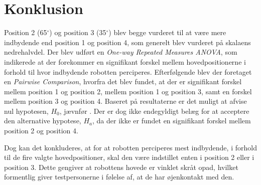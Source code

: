 \section{Konklusion}
\label{SkaleringseksperimentKonklusion}
%
Position 2 (65$^{\circ}$) og position 3 (35$^{\circ}$) blev begge vurderet til at være mere indbydende end position 1 og position 4, som generelt blev vurderet på skalaens nedrehalvdel. Der blev udført en \textit{One-way Repeated Measures ANOVA}, som indikerede at der forekommer en signifikant forskel mellem hovedpositionerne i forhold til hvor indbydende robotten perciperes. Efterfølgende blev der foretaget en \textit{Pairwise Comparison}, hvorfra det blev fundet, at der er signifikant forskel mellem position 1 og position 2, mellem position 1 og position 3, samt en forskel mellem position 3 og position 4. Baseret på resultaterne er det muligt at afvise nul hypotesen, $H_0$, jævnfør . Der er dog ikke endegyldigt belæg for at acceptere den alternative hypotese, $H_a$, da der ikke er fundet en signifikant forskel mellem position 2 og position 4. 

Dog kan det konkluderes, at for at robotten perciperes mest indbydende, i forhold til de fire valgte hovedpositioner, skal den være indstillet enten i position 2 eller i position 3. Dette gengiver at robottens hovede er vinklet skråt opad, hvilket formentlig giver testpersonerne i følelse af, at de har øjenkontakt med den.       
